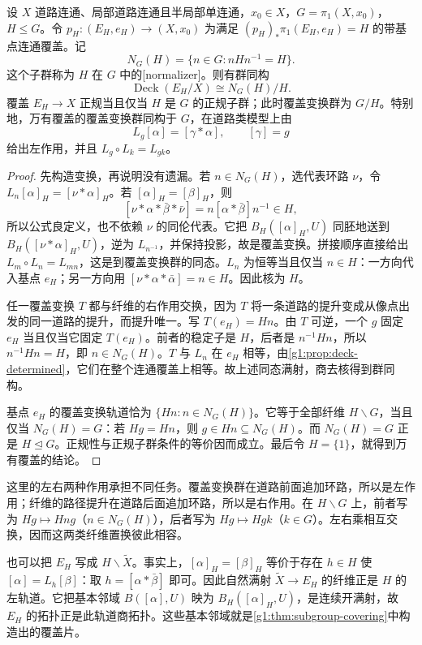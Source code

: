 \begin{theorem}\label{g1:thm:normal-covering-deck}
	设 \(X\) 道路连通、局部道路连通且半局部单连通，\(x_0\in X\)，\(G=\pi_1(X,x_0)\)，\(H\le G\)。令 \(p_H:(E_H,e_H)\to(X,x_0)\) 为满足 \((p_H)_*\pi_1(E_H,e_H)=H\) 的带基点连通覆盖。记
	\[
		N_G(H)=\{n\in G:nHn^{-1}=H\}.
	\]
	这个子群称为 \(H\) 在 \(G\) 中的[normalizer]。则有群同构
	\[
		\operatorname{Deck}(E_H/X)\cong N_G(H)/H.
	\]
	覆盖 \(E_H\to X\) 正规当且仅当 \(H\) 是 \(G\) 的正规子群；此时覆盖变换群为 \(G/H\)。特别地，万有覆盖的覆盖变换群同构于 \(G\)，在道路类模型上由
	\[
		L_g[\alpha]=[\gamma*\alpha],\qquad [\gamma]=g
	\]
	给出左作用，并且 \(L_g\circ L_k=L_{gk}\)。
\end{theorem}
\begin{proof}
	先构造变换，再说明没有遗漏。若 \(n\in N_G(H)\)，选代表环路 \(\nu\)，令 \(L_n[\alpha]_H=[\nu*\alpha]_H\)。若 \([\alpha]_H=[\beta]_H\)，则
	\[
		[\nu*\alpha*\bar\beta*\bar\nu]
		=n[\alpha*\bar\beta]n^{-1}\in H,
	\]
	所以公式良定义，也不依赖 \(\nu\) 的同伦代表。它把 \(B_H([\alpha]_H,U)\) 同胚地送到 \(B_H([\nu*\alpha]_H,U)\)，逆为 \(L_{n^{-1}}\)，并保持投影，故是覆盖变换。拼接顺序直接给出 \(L_m\circ L_n=L_{mn}\)，这是到覆盖变换群的同态。\(L_n\) 为恒等当且仅当 \(n\in H\)：一方向代入基点 \(e_H\)；另一方向用 \([\nu*\alpha*\bar\alpha]=n\in H\)。因此核为 \(H\)。

	任一覆盖变换 \(T\) 都与纤维的右作用交换，因为 \(T\) 将一条道路的提升变成从像点出发的同一道路的提升，而提升唯一。写 \(T(e_H)=Hn\)。由 \(T\) 可逆，一个 \(g\) 固定 \(e_H\) 当且仅当它固定 \(T(e_H)\)。前者的稳定子是 \(H\)，后者是 \(n^{-1}Hn\)，所以 \(n^{-1}Hn=H\)，即 \(n\in N_G(H)\)。\(T\) 与 \(L_n\) 在 \(e_H\) 相等，由\cref{g1:prop:deck-determined}，它们在整个连通覆盖上相等。故上述同态满射，商去核得到群同构。

	基点 \(e_H\) 的覆盖变换轨道恰为 \(\{Hn:n\in N_G(H)\}\)。它等于全部纤维 \(H\backslash G\)，当且仅当 \(N_G(H)=G\)：若 \(Hg=Hn\)，则 \(g\in Hn\subseteq N_G(H)\)。而 \(N_G(H)=G\) 正是 \(H\trianglelefteq G\)。正规性与正规子群条件的等价因而成立。最后令 \(H=\{1\}\)，就得到万有覆盖的结论。
\end{proof}

这里的左右两种作用承担不同任务。覆盖变换群在道路前面追加环路，所以是左作用；纤维的路径提升在道路后面追加环路，所以是右作用。在 \(H\backslash G\) 上，前者写为 \(Hg\mapsto Hng\)（\(n\in N_G(H)\)），后者写为 \(Hg\mapsto Hgk\)（\(k\in G\)）。左右乘相互交换，因而这两类纤维置换彼此相容。

也可以把 \(E_H\) 写成 \(H\backslash\widetilde X\)。事实上，\([\alpha]_H=[\beta]_H\) 等价于存在 \(h\in H\) 使 \([\alpha]=L_h[\beta]\)：取 \(h=[\alpha*\bar\beta]\) 即可。因此自然满射 \(\widetilde X\to E_H\) 的纤维正是 \(H\) 的左轨道。它把基本邻域 \(B([\alpha],U)\) 映为 \(B_H([\alpha]_H,U)\)，是连续开满射，故 \(E_H\) 的拓扑正是此轨道商拓扑。这些基本邻域就是\cref{g1:thm:subgroup-covering}中构造出的覆盖片。

